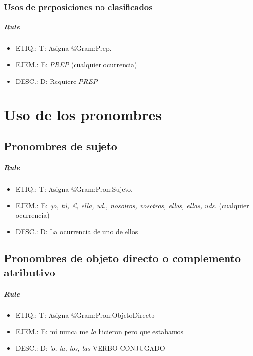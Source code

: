 \documentclass[11pt]{report}
\begin{document}
\subsection{Usos de preposiciones no clasificados}
\paragraph*{Rule}
\begin{itemize}
\item ETIQ.:  T: Asigna @Gram:Prep.
\item EJEM.:  E: \emph{PREP} (cualquier ocurrencia)
\item DESC.:  D: Requiere \emph{PREP}
\end{itemize}

\chapter{Uso de los pronombres}
\section{Pronombres de sujeto}
\paragraph*{Rule}
\begin{itemize}
\item ETIQ.:  T: Asigna @Gram:Pron:Sujeto.
\item EJEM.:  E: \emph{yo, tú, él, ella, ud., nosotros, vosotros, ellos, ellas, uds.} (cualquier ocurrencia)
\item DESC.:  D: La ocurrencia de uno de ellos
\end{itemize}

\section{Pronombres de objeto directo o complemento atributivo}
\paragraph*{Rule}
\begin{itemize}
\item ETIQ.:  T: Asigna @Gram:Pron:ObjetoDirecto
\item EJEM.:  E: mí nunca me \emph{la} hicieron pero que estabamos
\item DESC.:  D: \emph{lo, la, los, las} VERBO CONJUGADO
\end{itemize}
\end{document}
